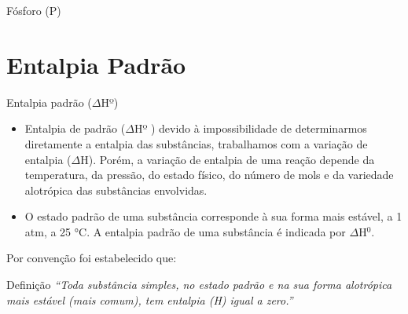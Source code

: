 \documentclass[presentation,professionalfonts,aspectratio=169]{beamer}
\begin{document}
\begin{frame}[label={sec:orgefc5579}]{Fósforo (P)}
\begin{center}
\end{center}
\end{frame}




\section{Entalpia Padrão}
\label{sec:orge687fcf}

\begin{frame}[label={sec:org4344541}]{Entalpia padrão (\(\Delta\)Hº)}
\begin{itemize}
\item \alert{Entalpia de padrão (\(\Delta\)Hº )} devido à impossibilidade de determinarmos diretamente a entalpia das substâncias, trabalhamos com a variação de entalpia (\(\Delta\)H). Porém, a variação de entalpia de uma reação depende da temperatura, da pressão, do estado físico, do número de mols e da variedade alotrópica das substâncias envolvidas.
\item O estado padrão de uma substância corresponde à sua forma mais estável, a 1 atm, a 25 °C. A entalpia padrão de uma substância é indicada por \(\Delta\)H\(^0\).
\end{itemize}

Por convenção foi estabelecido que:

\begin{bclogo}[logo=\bcinfo]{Definição}
\emph{\alert{“Toda substância simples, no estado padrão e na sua forma alotrópica mais estável (mais comum), tem entalpia (H) igual a zero.”}}
\end{bclogo}
\end{frame}
\end{document}
